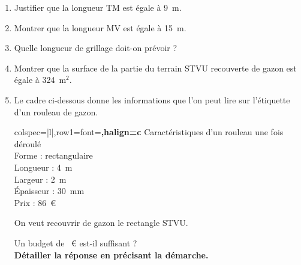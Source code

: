 \begin{enumerate}
	\item Justifier que la longueur TM est égale à 9~m.
	\item Montrer que la longueur MV est égale à 15~m.
	\item Quelle longueur de grillage doit-on prévoir ?
	\item Montrer que la surface de la partie du terrain STVU recouverte de gazon est égale à 324~m$^2$.
	\item Le cadre ci-dessous donne les informations que l'on peut lire sur l'étiquette d'un rouleau de gazon.

	\begin{center}
	\begin{tblr}{colspec={|l|},row{1}={font=\bfseries,halign=c}}
		\hline
		Caractéristiques d'un rouleau une fois déroulé \\
		Forme : rectangulaire \\
		Longueur : 4~m \\
		Largeur : 2~m \\
		Épaisseur : 30~mm \\
		Prix : 86~\euro \\ \hline
	\end{tblr}
	\end{center}

	On veut recouvrir de gazon le rectangle STVU.

	Un budget de ~\euro{} est-il suffisant ?\\
	\textbf{Détailler la réponse en précisant la démarche.}
\end{enumerate}

